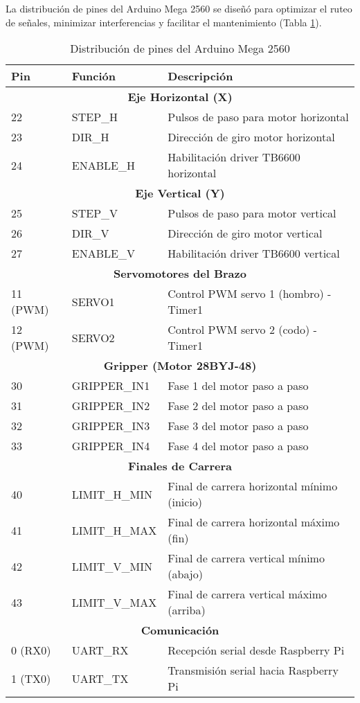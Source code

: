 La distribución de pines del Arduino Mega 2560 se diseñó para optimizar el ruteo de señales, minimizar interferencias y facilitar el mantenimiento (Tabla \ref{tab:distribucion_pines}).

\begin{table}[H]
\centering
\caption{Distribución de pines del Arduino Mega 2560}
\label{tab:distribucion_pines}
\begin{tabular}{|l|l|p{6cm}|}
\hline
\textbf{Pin} & \textbf{Función} & \textbf{Descripción} \\
\hline
\multicolumn{3}{|c|}{\textbf{Eje Horizontal (X)}} \\
\hline
22 & STEP\_H & Pulsos de paso para motor horizontal \\
23 & DIR\_H & Dirección de giro motor horizontal \\
24 & ENABLE\_H & Habilitación driver TB6600 horizontal \\
\hline
\multicolumn{3}{|c|}{\textbf{Eje Vertical (Y)}} \\
\hline
25 & STEP\_V & Pulsos de paso para motor vertical \\
26 & DIR\_V & Dirección de giro motor vertical \\
27 & ENABLE\_V & Habilitación driver TB6600 vertical \\
\hline
\multicolumn{3}{|c|}{\textbf{Servomotores del Brazo}} \\
\hline
11 (PWM) & SERVO1 & Control PWM servo 1 (hombro) - Timer1 \\
12 (PWM) & SERVO2 & Control PWM servo 2 (codo) - Timer1 \\
\hline
\multicolumn{3}{|c|}{\textbf{Gripper (Motor 28BYJ-48)}} \\
\hline
30 & GRIPPER\_IN1 & Fase 1 del motor paso a paso \\
31 & GRIPPER\_IN2 & Fase 2 del motor paso a paso \\
32 & GRIPPER\_IN3 & Fase 3 del motor paso a paso \\
33 & GRIPPER\_IN4 & Fase 4 del motor paso a paso \\
\hline
\multicolumn{3}{|c|}{\textbf{Finales de Carrera}} \\
\hline
40 & LIMIT\_H\_MIN & Final de carrera horizontal mínimo (inicio) \\
41 & LIMIT\_H\_MAX & Final de carrera horizontal máximo (fin) \\
42 & LIMIT\_V\_MIN & Final de carrera vertical mínimo (abajo) \\
43 & LIMIT\_V\_MAX & Final de carrera vertical máximo (arriba) \\
\hline
\multicolumn{3}{|c|}{\textbf{Comunicación}} \\
\hline
0 (RX0) & UART\_RX & Recepción serial desde Raspberry Pi \\
1 (TX0) & UART\_TX & Transmisión serial hacia Raspberry Pi \\
\hline
\end{tabular}
\end{table}

